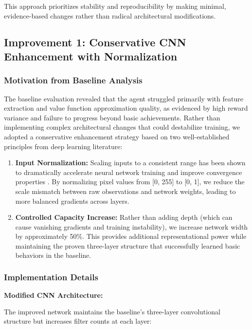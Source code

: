 \documentclass[twocolumn]{article}
\begin{document}
This approach prioritizes stability and reproducibility by making minimal, evidence-based changes rather than radical architectural modifications.

\subsection*{Improvement 1: Conservative CNN Enhancement with Normalization}

\subsubsection*{Motivation from Baseline Analysis}

The baseline evaluation revealed that the agent struggled primarily with feature extraction and value function approximation quality, as evidenced by high reward variance and failure to progress beyond basic achievements. Rather than implementing complex architectural changes that could destabilize training, we adopted a conservative enhancement strategy based on two well-established principles from deep learning literature:

\begin{enumerate}
    \item \textbf{Input Normalization:} Scaling inputs to a consistent range has been shown to dramatically accelerate neural network training and improve convergence properties \parencite{ioffe2015batch}. By normalizing pixel values from [0, 255] to [0, 1], we reduce the scale mismatch between raw observations and network weights, leading to more balanced gradients across layers.
    
    \item \textbf{Controlled Capacity Increase:} Rather than adding depth (which can cause vanishing gradients and training instability), we increase network width by approximately 50\%. This provides additional representational power while maintaining the proven three-layer structure that successfully learned basic behaviors in the baseline.
\end{enumerate}

\subsubsection*{Implementation Details}

\textbf{Modified CNN Architecture:}

The improved network maintains the baseline's three-layer convolutional structure but increases filter counts at each layer:
\end{document}
